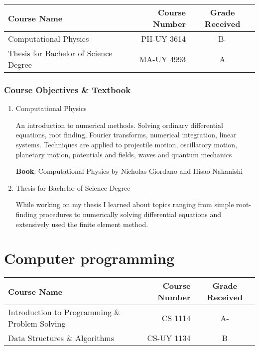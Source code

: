\documentclass[11pt]{article}
\begin{document}
\begin{center}
\begin{tabular}{lrc}
Course Name & Course Number & Grade Received \\ \toprule
Computational Physics & PH-UY 3614 & B- \\
Thesis for Bachelor of Science Degree & MA-UY 4993 & A
\end{tabular}
\end{center}

\subsubsection*{Course Objectives \& Textbook}
\begin{enumerate}
    \item Computational Physics

    An introduction to numerical methods. Solving ordinary differential equations, root finding, Fourier transforms, numerical integration, linear systems. Techniques are applied to projectile motion, oscillatory motion, planetary motion, potentials and fields, waves and quantum mechanics
    
    \textbf{Book}: Computational Physics by Nicholas Giordano and Hisao Nakanishi
    
    \item Thesis for Bachelor of Science Degree
    
    While working on my thesis I learned about topics ranging from simple root-finding procedures to numerically solving differential equations and extensively used the finite element method.
\end{enumerate}

\section*{Computer programming}

\begin{center}
\begin{tabular}{lrc}
Course Name & Course Number & Grade Received \\ \toprule
Introduction to Programming \& Problem Solving & CS 1114 & A- \\
Data Structures \& Algorithms & CS-UY 1134 & B
\end{tabular}
\end{center}
\end{document}
